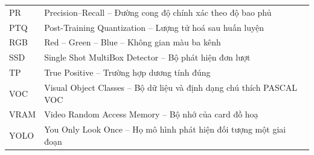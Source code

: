 \begin{longtable}{>{\centering\arraybackslash}p{3.2cm} p{10.5cm}}
    PR & Precision--Recall -- Đường cong độ chính xác theo độ bao phủ \\

    PTQ & Post-Training Quantization -- Lượng tử hoá sau huấn luyện \\

    RGB & Red -- Green -- Blue -- Không gian màu ba kênh \\

    SSD & Single Shot MultiBox Detector -- Bộ phát hiện đơn lượt \\

    TP & True Positive -- Trường hợp dương tính đúng \\

    VOC & Visual Object Classes -- Bộ dữ liệu và định dạng chú thích PASCAL VOC \\

    VRAM & Video Random Access Memory -- Bộ nhớ của card đồ hoạ \\

    YOLO & You Only Look Once -- Họ mô hình phát hiện đối tượng một giai đoạn \\

    \bottomrule
\end{longtable}
